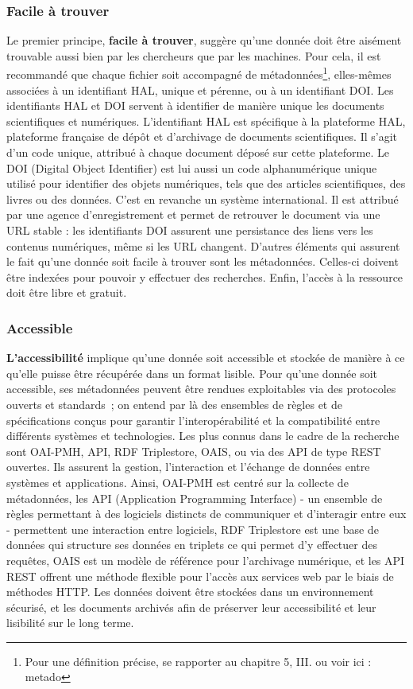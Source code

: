             \subsubsection{Facile à trouver}

Le premier principe, \textbf{facile à trouver}, suggère qu’une donnée doit être aisément trouvable aussi bien par les chercheurs que par les machines. Pour cela, il est recommandé que chaque fichier soit accompagné de métadonnées\footnote{Pour une définition précise, se rapporter au chapitre 5, III. ou voir ici : \gls{metado}}, elles-mêmes associées à un identifiant HAL, unique et pérenne, ou à un identifiant DOI. Les identifiants HAL et DOI servent à identifier de manière unique les documents scientifiques et numériques. L'identifiant HAL est spécifique à la plateforme HAL, plateforme française de dépôt et d'archivage de documents scientifiques. Il s’agit d’un code unique, attribué à chaque document déposé sur cette plateforme. Le DOI (Digital Object Identifier) est lui aussi un code alphanumérique unique utilisé pour identifier des objets numériques, tels que des articles scientifiques, des livres ou des données. C’est en revanche un système international. Il est attribué par une agence d'enregistrement et permet de retrouver le document via une URL stable : les identifiants DOI assurent une persistance des liens vers les contenus numériques, même si les URL changent.  D’autres éléments qui assurent le fait qu’une donnée soit facile à trouver sont les métadonnées. Celles-ci doivent être indexées pour pouvoir y effectuer des recherches. Enfin, l’accès à la ressource doit être libre et gratuit.
            
            \subsubsection{Accessible}

\textbf{L’accessibilité} implique qu’une donnée soit accessible et stockée de manière à ce qu’elle puisse être récupérée dans un format lisible. Pour qu’une donnée soit accessible, ses métadonnées peuvent être rendues exploitables via des protocoles ouverts et standards ; on entend par là des ensembles de règles et de spécifications conçus pour garantir l'interopérabilité et la compatibilité entre différents systèmes et technologies. Les plus connus dans le cadre de la recherche sont OAI-PMH, API, RDF Triplestore, OAIS, ou via des API de type REST ouvertes. Ils assurent la gestion, l'interaction et l'échange de données entre systèmes et applications. Ainsi, OAI-PMH est centré sur la collecte de métadonnées, les API (Application Programming Interface) - un ensemble de règles permettant à des logiciels distincts de communiquer et d'interagir entre eux - permettent une interaction entre logiciels, RDF Triplestore est une base de données qui structure ses données en triplets ce qui permet d’y effectuer des requêtes, OAIS est un modèle de référence pour l'archivage numérique, et les API REST offrent une méthode flexible pour l'accès aux services web par le biais de méthodes HTTP. Les données doivent être stockées dans un environnement sécurisé, et les documents archivés afin de préserver leur accessibilité et leur lisibilité sur le long terme.

